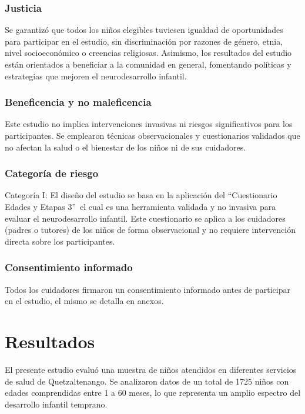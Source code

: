 \documentclass[11pt,letterpaper]{report}
\newcommand{\asq}{“Cuestionario Edades y Etapas 3”}
\begin{document}
\subsection{Justicia}
Se garantizó que todos los niños elegibles tuviesen igualdad de oportunidades
para participar en el estudio, sin discriminación por razones de género, etnia,
nivel socioeconómico o creencias religiosas. Asimismo, los resultados del
estudio están orientados a beneficiar a la comunidad en general, fomentando
políticas y estrategias que mejoren el neurodesarrollo infantil.

\subsection{Beneficencia y no maleficencia}
Este estudio no implica intervenciones invasivas ni riesgos significativos para
los participantes. Se emplearon técnicas observacionales y cuestionarios
validados que no afectan la salud o el bienestar de los niños ni de sus
cuidadores.

\subsection{Categoría de riesgo}
Categoría I: El diseño del estudio se basa en la aplicación del \asq\ el cual
es una herramienta validada y no invasiva para evaluar el neurodesarrollo
infantil. Este cuestionario se aplica a los cuidadores (padres o tutores) de
los niños de forma observacional y no requiere intervención directa sobre los
participantes.

\subsection{Consentimiento informado}
Todos los cuidadores firmaron un consentimiento informado antes de participar
en el estudio, el mismo se detalla en anexos.

\chapter{Resultados}
El presente estudio evaluó una muestra de niños atendidos en diferentes
servicios de salud de Quetzaltenango. Se analizaron datos de un total de 1725
niños con edades comprendidas entre 1 a 60 meses, lo que representa un amplio
espectro del desarrollo infantil temprano.
\end{document}
